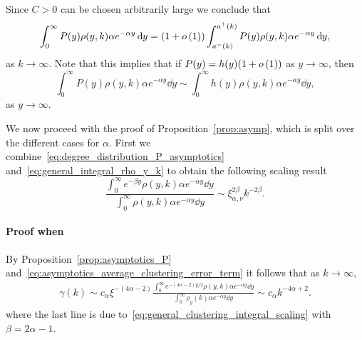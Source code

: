 Since $C > 0$ can be chosen arbitrarily large we conclude that
\[
	\int_0^\infty P(y) \rho(y,k) \alpha e^{-\alpha y} \operatorname{\mathrm{d}\hspace{-2pt}} y
	= (1+o\left(1\right)) \int_{a^-(k)}^{a^+(k)} P(y) \rho(y,k) \alpha e^{-\alpha y} \operatorname{\mathrm{d}\hspace{-2pt}} y,
\]
as $k \to \infty$. Note that this implies that if $P(y) = h(y)(1 + o\left(1\right))$ as $y \to \infty$, then 
\begin{equation}\label{eq:asymptotics_average_clustering_error_term}
	\int_0^\infty P(y) \rho(y,k) \alpha e^{-\alpha y} \dd y
	\sim \int_0^\infty h(y) \rho(y,k) \alpha e^{-\alpha y} \dd y,
\end{equation}
as $y \to \infty$.


We now proceed with the proof of Proposition~\ref{prop:asymp}, which is split over the different cases for $\alpha$. First we combine~\eqref{eq:degree_distribution_P_asymptotics} and~\eqref{eq:general_integral_rho_y_k} to obtain the following scaling result
\begin{equation}\label{eq:general_clustering_integral_scaling}
	\frac{\int_0^\infty e^{-\beta y} \rho(y,k) \alpha e^{-\alpha y} \dd y}
	{\int_0^\infty \rho(y,k) \alpha e^{-\alpha y} \dd y}
	\sim \xi_{\alpha, \nu}^{2\beta} k^{-2\beta}.
\end{equation}


\paragraph{Proof when }
By Proposition~\ref{prop:asymptotics_P} and~\eqref{eq:asymptotics_average_clustering_error_term}  it follows that as $k \to \infty$,
\begin{align*}
	\gamma(k) \sim c_\alpha \xi^{-(4\alpha - 2)} \frac{\int_0^{\infty} e^{-(4\alpha - 2)y/2} \rho(y,k) \alpha  e^{-\alpha y} \dd y}
		{\int_0^\infty \rho_{y}(k) \alpha e^{-\alpha y} \dd y} 
	\sim c_\alpha k^{-4\alpha + 2}.
\end{align*}
where the last line is due to~\eqref{eq:general_clustering_integral_scaling} with $\beta = 2\alpha - 1$.

